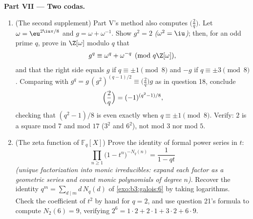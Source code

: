 \begin{problem}
\medskip
\noindent\textbf{Part VII --- Two codas.}
\begin{enumerate}[resume]
  \item (The second supplement) Part V's method also computes
        $\bigl(\frac2q\bigr)$. Let $\omega = \eu^{2\iu\pi/8}$
        and $g = \omega + \omega^{-1}$. Show $g^2 = 2$
        \emph{($\omega^2 = \iu$)}; then, for an odd prime $q$,
        prove in $\Z[\omega]$ modulo $q$ that
        \[
        g^q \equiv \omega^q + \omega^{-q} \pmod{q\Z[\omega]},
        \]
        and that the right side equals $g$ if $q \equiv \pm1
        \pmod 8$ and $-g$ if $q \equiv \pm3 \pmod 8$. Comparing
        with $g^q = g\,(g^2)^{(q-1)/2} \equiv
        \bigl(\frac2q\bigr)g$ as in question 18, conclude
        \[
        \Bigl(\frac2q\Bigr) = (-1)^{(q^2-1)/8},
        \]
        checking that $(q^2 - 1)/8$ is even exactly when $q
        \equiv \pm1 \pmod 8$. Verify: $2$ is a square mod $7$
        and mod $17$ ($3^2$ and $6^2$), not mod $3$ nor mod
        $5$.
  \item (The zeta function of $\mathbb F_q[X]$) Prove the
        identity of formal power series in $t$:
        \[
        \prod_{n \geq 1}\bigl(1 - t^n\bigr)^{-N_q(n)}
        = \frac1{1 - qt}
        \]
        \emph{(unique factorization into monic irreducibles:
        expand each factor as a geometric series and count
        monic polynomials of degree $n$)}. Recover the identity
        $q^m = \sum_{d \mid m}d\,N_q(d)$ of
        \cref{exo:b3:galois:6} by taking logarithms. Check the
        coefficient of $t^2$ by hand for $q = 2$, and use
        question 21's formula to compute $N_2(6) = 9$,
        verifying $2^6 = 1\cdot2 + 2\cdot1 + 3\cdot2 +
        6\cdot9$.
\end{enumerate}
\end{problem}
